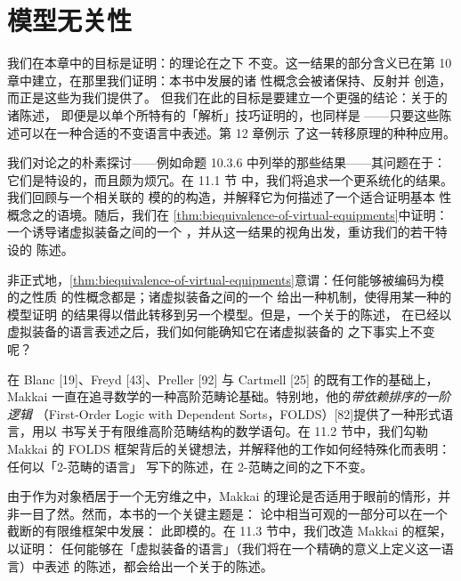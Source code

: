 \chapter{模型无关性}\label{ch:model-independence}


我们在本章中的目标是证明：\trInfinityCategories{}的理论在\trChangeOfModel{}之下
不变。这一结果的部分含义已在第 10 章中建立，在那里我们证明：本书中发展的诸%
\trInfinityCategory{}性概念会被诸\trCosmologicalBiequivalence{}保持、反射并
创造，而正是这些\trBiequivalence{}为我们提供了\trChangeOfModel{}\trFunctor。
但我们在此的目标是要建立一个更强的结论：关于\trInfinityCategories{}的诸陈述，
即便是以单个\trInfinityCosmos{}所特有的「解析」技巧证明的，也同样是\trModelIndependent{}
——只要这些陈述可以在一种合适的\trEquivalence{}不变语言中表述。第 12 章例示
了这一转移原理的种种应用。

我们对\trInfinityCategory{}论之\trModelIndependence{}的朴素探讨——例如命题
10.3.6 中列举的那些结果——其问题在于：它们是特设的，而且颇为烦冗。在 11.1 节
中，我们将追求一个更系统化的结果。我们回顾与一个\trInfinityCosmos{}相关联的
模的\trVirtualEquipment{}的构造，并解释它为何描述了一个适合证明基本%
\trInfinityCategory{}性概念之\trModelIndependence{}的语境。随后，我们在%
\cref{thm:biequivalence-of-virtual-equipments}中证明：一个\trCosmologicalBiequivalence{}诱导诸虚拟装备之间的一个%
\trBiequivalence，并从这一结果的视角出发，重访我们的若干特设的%
\trModelIndependence{}陈述。

非正式地，\cref{thm:biequivalence-of-virtual-equipments}意谓：任何能够被编码为模的\trVirtualEquipment{}之性质
的\trInfinityCategory{}性概念都是\trModelIndependent{}；诸虚拟装备之间的一个%
\trBiequivalence{}给出一种机制，使得用某一种\trInfinityCategory{}的模型证明
的结果得以借此转移到另一个模型。但是，一个关于\trInfinityCategories{}的陈述，
在已经以虚拟装备的语言表述之后，我们如何能确知它在诸虚拟装备的%
\trBiequivalence{}之下事实上不变呢？

在 Blanc [19]、Freyd [43]、Preller [92] 与 Cartmell [25] 的既有工作的基础上，
Makkai 一直在追寻数学的一种高阶范畴论基础。特别地，他的\emph{带依赖排序的一阶逻辑}%
（First-Order Logic with Dependent Sorts，FOLDS）[82]提供了一种形式语言，用以
书写关于有限维高阶范畴结构的数学语句。在 11.2 节中，我们勾勒 Makkai 的 FOLDS
框架背后的关键想法，并解释他的工作如何经特殊化而表明：任何以「2-范畴的语言」
写下的陈述，在 2-范畴之间的\trBiequivalence{}之下不变。

由于\trInfinityCategories{}作为对象栖居于一个无穷维\trCategory{}之中，Makkai
的理论是否适用于眼前的情形，并非一目了然。然而，本书的一个关键主题是：%
\trInfinityCategory{}论中相当可观的一部分可以在一个截断的有限维框架中发展：
此即模的\trVirtualEquipment{}。在 11.3 节中，我们改造 Makkai 的框架，以证明：
任何能够在「虚拟装备的语言」（我们将在一个精确的意义上定义这一语言）中表述
的陈述，都会给出一个关于\trInfinityCategories{}的\trModelIndependent{}陈述。


